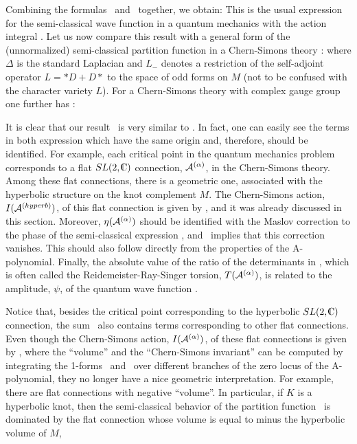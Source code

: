 Combining the formulas \semiclassb\ and \tots\ together, we obtain:
%
\eqn{}
%
This is the usual expression for the semi-classical wave
function in a quantum mechanics with the action integral \tots.
Let us now compare this result with a general form of
the (unnormalized) semi-classical partition function
in a Chern-Simons theory \WittenJones:
%
\eqn{}
%
where $\Delta$ is the standard Laplacian and
$L_-$ denotes a restriction of the self-adjoint operator
$L=*D + D*$ to the space of odd forms on $M$
(not to be confused with the character variety $L$).
For a Chern-Simons theory with complex gauge group
one further has :
%
\eqn{}
%

It is clear that our result \semiclassz\ is very similar
to \semiclasscs.
In fact, one can easily see the terms in both expression
which have the same origin and, therefore, should be identified.
For example, each critical point in the quantum mechanics
problem corresponds to a flat $SL(2,\IC)$ connection, ${\cal A}^{(\alpha)}$,
in the Chern-Simons theory.
Among these flat connections, there is a geometric one,
associated with the hyperbolic structure on the knot complement $M$.
The Chern-Simons action, $I({\cal A}^{(hyperb)})$, of this flat connection
is given by \tots, and it was already discussed in this section.
Moreover, $\eta ({\cal A}^{(\alpha)})$ should be identified with
the Maslov correction to the phase of the semi-classical
expression \semiclassz, and \zeroeta\ implies that this
correction vanishes.
This should also follow directly from
the properties of the A-polynomial.
Finally, the absolute value of
the ratio of the determinants in \semiclasscs,
which is often called the Reidemeister-Ray-Singer torsion, $T({\cal A}^{(\alpha)})$,
%
\eqn{}
%
is related to the amplitude, $\psi$, of the quantum
wave function \semiclassz.

Notice that, besides the critical point corresponding to
the hyperbolic $SL(2,\IC)$ connection, the sum \semiclassz\ also
contains terms corresponding to other flat connections.
Even though the Chern-Simons action, $I({\cal A}^{(\alpha)})$,
of these flat connections is given by \tots,
where the ``volume'' and the ``Chern-Simons invariant''
can be computed by integrating the 1-forms \ktheta\ and \stheta\
over different branches of the zero locus of the A-polynomial,
they no longer have a nice geometric interpretation.
For example, there are flat connections with negative ``volume''.
In particular, if $K$ is a hyperbolic knot, then the semi-classical behavior
of the partition function \semiclasscs\ is dominated by the flat
connection whose volume is equal to minus the hyperbolic volume of $M$,
%
\eqn{}
%


